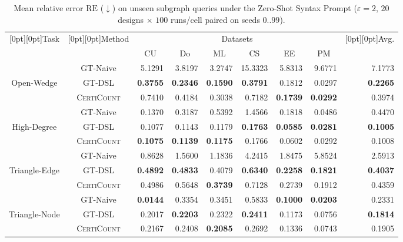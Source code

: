 \documentclass[conference]{IEEEtran}
\theoremstyle{ieeeitalic}
\newcommand{\RE}{\mathrm{RE}}
\begin{document}
\begin{table}[t]
\centering
\caption{Mean relative error $\RE$ ($\downarrow$) on unseen subgraph queries under the Zero-Shot Syntax Prompt ($\varepsilon=2$, $20$ designs $\times$ $100$ runs/cell paired on seeds $0..99$).}
\label{tab:rq4}
\scriptsize
\renewcommand{\arraystretch}{1.0}
\setlength{\tabcolsep}{8pt}
\begin{tabular}{ccrrrrrrr}
\toprule
\raisebox{-1.2ex}[0pt][0pt]{Task} & \raisebox{-1.2ex}[0pt][0pt]{Method} & \multicolumn{6}{c}{Datasets} & \raisebox{-1.2ex}[0pt][0pt]{Avg.} \\
\cmidrule(lr){3-8}
 & & \multicolumn{1}{c}{CU} & \multicolumn{1}{c}{Do} & \multicolumn{1}{c}{ML} & \multicolumn{1}{c}{CS} & \multicolumn{1}{c}{EE} & \multicolumn{1}{c}{PM} & \\
\midrule
 & GT-Naive & 5.1291 & 3.8197 & 3.2747 & 15.3323 & 5.8313 & 9.6771 & 7.1773 \\
Open-Wedge & GT-DSL & \textbf{0.3755} & \textbf{0.2346} & \textbf{0.1590} & \textbf{0.3791} & 0.1812 & 0.0297 & \textbf{0.2265} \\
 & \textsc{CertiCount} & 0.7410 & 0.4184 & 0.3038 & 0.7182 & \textbf{0.1739} & \textbf{0.0292} & 0.3974 \\
\midrule
 & GT-Naive & 0.1370 & 0.3187 & 0.5392 & 1.4566 & 0.1818 & 0.0486 & 0.4470 \\
High-Degree & GT-DSL & 0.1077 & 0.1143 & 0.1179 & \textbf{0.1763} & \textbf{0.0585} & \textbf{0.0281} & \textbf{0.1005} \\
 & \textsc{CertiCount} & \textbf{0.1075} & \textbf{0.1139} & \textbf{0.1175} & 0.1766 & 0.0602 & 0.0292 & 0.1008 \\
\midrule
 & GT-Naive & 0.8628 & 1.5600 & 1.1836 & 4.2415 & 1.8475 & 5.8524 & 2.5913 \\
Triangle-Edge & GT-DSL & \textbf{0.4892} & \textbf{0.4833} & 0.4079 & \textbf{0.6340} & \textbf{0.2258} & \textbf{0.1821} & \textbf{0.4037} \\
 & \textsc{CertiCount} & 0.4986 & 0.5648 & \textbf{0.3739} & 0.7128 & 0.2739 & 0.1912 & 0.4359 \\
\midrule
 & GT-Naive & \textbf{0.0144} & 0.3354 & 0.3451 & 0.5833 & \textbf{0.1000} & \textbf{0.0203} & 0.2331 \\
Triangle-Node & GT-DSL & 0.2017 & \textbf{0.2203} & 0.2322 & \textbf{0.2411} & 0.1173 & 0.0756 & \textbf{0.1814} \\
 & \textsc{CertiCount} & 0.2167 & 0.2408 & \textbf{0.2085} & 0.2692 & 0.1336 & 0.0743 & 0.1905 \\
\bottomrule
\end{tabular}
\vspace{-4pt}
\end{table}
\end{document}
